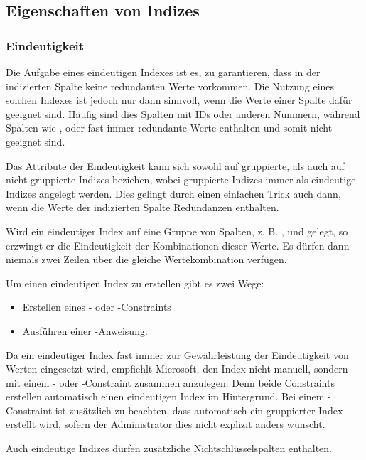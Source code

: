     \subsection{Eigenschaften von Indizes}
      \subsubsection{Eindeutigkeit}
        Die Aufgabe eines eindeutigen Indexes ist es, zu garantieren, dass in
        der indizierten Spalte keine redundanten Werte vorkommen. Die Nutzung
        eines solchen Indexes ist jedoch nur dann sinnvoll, wenn die Werte einer
        Spalte dafür geeignet sind. Häufig sind dies Spalten mit IDs oder
        anderen Nummern, während Spalten wie ,
         oder  fast immer
        redundante Werte enthalten und somit nicht geeignet sind.
        \begin{merke}
          Das Attribute der Eindeutigkeit kann sich sowohl auf gruppierte, als
          auch auf nicht gruppierte Indizes beziehen, wobei gruppierte Indizes
          immer als eindeutige Indizes angelegt werden. Dies gelingt durch einen
          einfachen Trick auch dann, wenn die Werte der indizierten Spalte
          Redundanzen enthalten.
        \end{merke}
        Wird ein eindeutiger Index auf eine Gruppe von Spalten, z. B.
        ,  und
         gelegt, so erzwingt er die Eindeutigkeit der
        Kombinationen dieser Werte. Es dürfen dann niemals zwei Zeilen über die
        gleiche Wertekombination verfügen.
        
        Um einen eindeutigen Index zu erstellen gibt es zwei Wege:
        \begin{itemize}
            \item Erstellen eines \PRIMARYKEY- oder \UNIQUE-Constraints
            \item Ausführen einer -Anweisung.
        \end{itemize}
        Da ein eindeutiger Index fast immer zur Gewährleistung der Eindeutigkeit
        von Werten eingesetzt wird, empfiehlt Microsoft, den Index nicht manuell,
        sondern mit einem \UNIQUE- oder \PRIMARYKEY-Constraint zusammen
        anzulegen. Denn beide Constraints erstellen automatisch einen
        eindeutigen Index im Hintergrund. Bei einem \PRIMARYKEY-Constraint ist
        zusätzlich zu beachten, dass automatisch ein gruppierter Index erstellt
        wird, sofern der Administrator dies nicht explizit anders wünscht.
        \begin{merke}
          Auch eindeutige Indizes dürfen zusätzliche Nichtschlüsselspalten
          enthalten.
        \end{merke}
        \begin{literaturinternet}
          \item \cite{ms187019}
        \end{literaturinternet}
